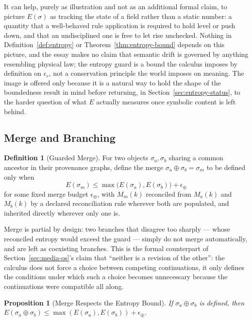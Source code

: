 \documentclass[11pt]{article}
\newtheorem{proposition}[theorem]{Proposition}
\theoremstyle{definition}
\newtheorem{definition}[theorem]{Definition}
\begin{document}
It can help, purely as illustration and not as an additional formal claim, to picture $E(\sigma)$ as tracking the state of a field rather than a static number: a quantity that a well-behaved rule application is required to hold level or push down, and that an undisciplined one is free to let rise unchecked. Nothing in Definition~\ref{def:entropy} or Theorem~\ref{thm:entropy-bound} depends on this picture, and the essay makes no claim that semantic drift is governed by anything resembling physical law; the entropy guard is a bound the calculus imposes by definition on $\epsilon_r$, not a conservation principle the world imposes on meaning. The image is offered only because it is a natural way to hold the shape of the boundedness result in mind before returning, in Section~\ref{sec:entropy-status}, to the harder question of what $E$ actually measures once symbolic content is left behind.

\subsection{Merge and Branching}

\begin{definition}[Guarded Merge]
\label{def:merge}
For two objects $\sigma_a, \sigma_b$ sharing a common ancestor in their provenance graphs, define the merge $\sigma_a \oplus \sigma_b = \sigma_m$ to be defined only when
\[
E(\sigma_m) \leq \max\bigl(E(\sigma_a), E(\sigma_b)\bigr) + \epsilon_\oplus
\]
for some fixed merge budget $\epsilon_\oplus$, with $M_m(k)$ reconciled from $M_a(k)$ and $M_b(k)$ by a declared reconciliation rule wherever both are populated, and inherited directly wherever only one is.
\end{definition}

Merge is partial by design: two branches that disagree too sharply --- whose reconciled entropy would exceed the guard --- simply do not merge automatically, and are left as coexisting branches. This is the formal counterpart of Section~\ref{sec:media-os}'s claim that ``neither is a revision of the other'': the calculus does not force a choice between competing continuations, it only defines the conditions under which such a choice becomes unnecessary because the continuations were compatible all along.

\begin{proposition}[Merge Respects the Entropy Bound]
\label{prop:merge-bound}
If $\sigma_a \oplus \sigma_b$ is defined, then $E(\sigma_a \oplus \sigma_b) \leq \max(E(\sigma_a), E(\sigma_b)) + \epsilon_\oplus$.
\end{proposition}
\end{document}
